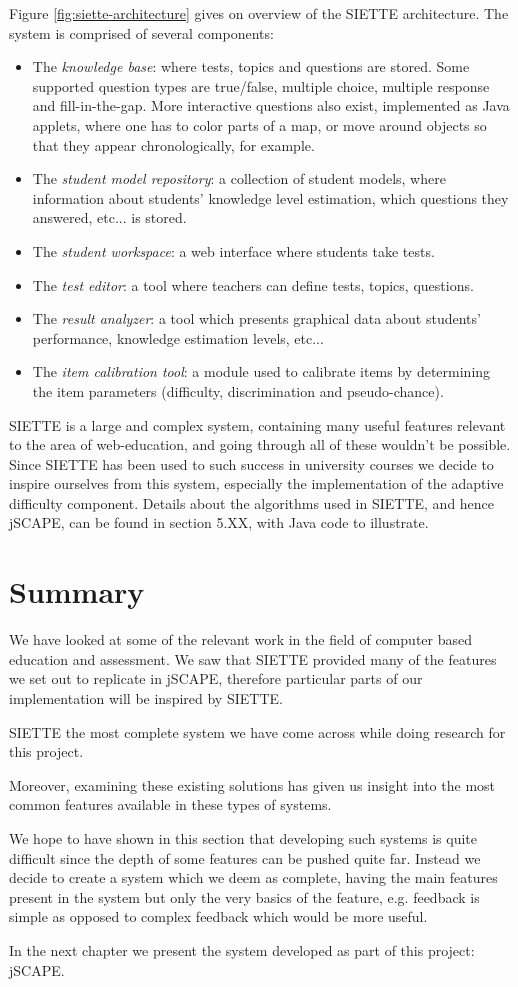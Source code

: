 Figure \ref{fig:siette-architecture} gives on overview of the SIETTE architecture. The system is comprised of several components\cite{SIETTE-components}:
\begin{itemize}
\item The \textit{knowledge base}: where tests, topics and questions are stored. Some supported question types are true/false, multiple choice, multiple response and fill-in-the-gap. More interactive questions also exist, implemented as Java applets, where one has to color parts of a map, or move around objects so that they appear chronologically, for example.
\item The \textit{student model repository}: a collection of student models, where information about students' knowledge level estimation, which questions they answered, etc... is stored.
\item The \textit{student workspace}: a web interface where students take tests.
\item The \textit{test editor}: a tool where teachers can define tests, topics, questions.
\item The \textit{result analyzer}: a tool which presents graphical data about students' performance, knowledge estimation levels, etc...
\item The \textit{item calibration tool}: a module used to calibrate items by determining the item parameters (difficulty, discrimination and pseudo-chance).
\end{itemize}

SIETTE is a large and complex system, containing many useful features relevant to the area of web-education, and going through all of these wouldn't be possible. Since SIETTE has been used to such success in university courses we decide to inspire ourselves from this system, especially the implementation of the adaptive difficulty component. Details about the algorithms used in SIETTE, and hence jSCAPE, can be found in section 5.XX, with Java code to illustrate.

\section{Summary}
We have looked at some of the relevant work in the field of computer based education and assessment. We saw that SIETTE provided many of the features we set out to replicate in jSCAPE, therefore particular parts of our implementation will be inspired by SIETTE.

SIETTE the most complete system we have come across while doing research for this project.

Moreover, examining these existing solutions has given us insight into the most common features available in these types of systems.

We hope to have shown in this section that developing such systems is quite difficult since the depth of some features can be pushed quite far. Instead we decide to create a system which we deem as complete, having the main features present in the system but only the very basics of the feature, e.g. feedback is simple as opposed to complex feedback which would be more useful.

In the next chapter we present the system developed as part of this project: jSCAPE. 